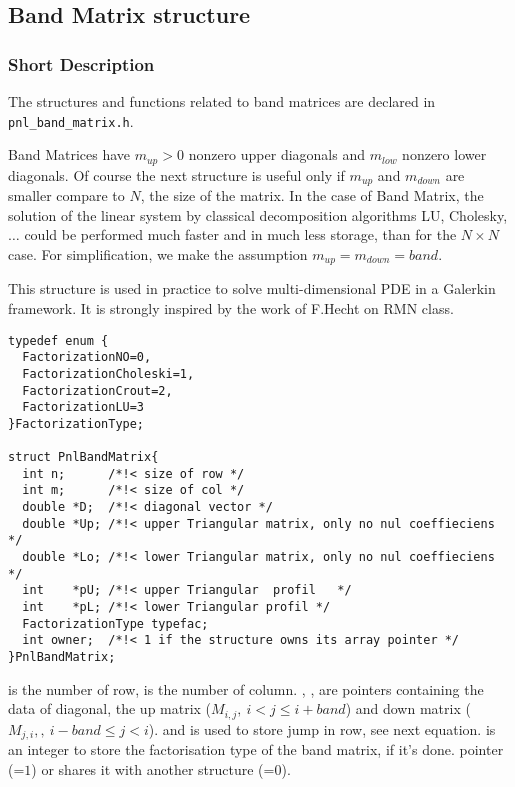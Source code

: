 \subsection{Band Matrix structure}
\subsubsection{Short Description}

The structures and functions related to band matrices are declared in
\verb!pnl_band_matrix.h!. 


Band Matrices have $m_{up}>0$ nonzero upper diagonals and $m_{low}$ nonzero
lower diagonals. Of course the next structure is useful only if $m_{up}$ and
$m_{down}$ are smaller compare to $N$, the size of the matrix. In the case of
Band Matrix, the solution of the linear system by classical decomposition
algorithms LU, Cholesky, $\dots$ could be performed much faster and in much
less storage, than for the $N\times N $ case. For simplification, we make the
assumption $m_{up}=m_{down}=band$.


This structure is used in practice to solve multi-dimensional PDE in a Galerkin
framework. It is strongly inspired by the work of F.Hecht on RMN class. 


\begin{verbatim}
typedef enum {
  FactorizationNO=0, 
  FactorizationCholeski=1, 
  FactorizationCrout=2, 
  FactorizationLU=3
}FactorizationType;

struct PnlBandMatrix{
  int n;      /*!< size of row */ 
  int m;      /*!< size of col */ 
  double *D;  /*!< diagonal vector */  
  double *Up; /*!< upper Triangular matrix, only no nul coeffieciens */ 
  double *Lo; /*!< lower Triangular matrix, only no nul coeffieciens */
  int    *pU; /*!< upper Triangular  profil   */ 
  int    *pL; /*!< lower Triangular profil */
  FactorizationType typefac;
  int owner;  /*!< 1 if the structure owns its array pointer */
}PnlBandMatrix;
\end{verbatim}

 is the number of row,  is the number of column.
, ,   are pointers containing the
data of diagonal, the up matrix ($M_{i, j}, \ i<j\leq i+band$) and  down
matrix ($M_{j, i}, , \ i-band\leq j<i$).
 and  is used to store jump in row, see next equation.
 is an integer to store the factorisation type of the band
matrix, if it's done.
pointer (=$1$) or shares it with another structure (=$0$).


